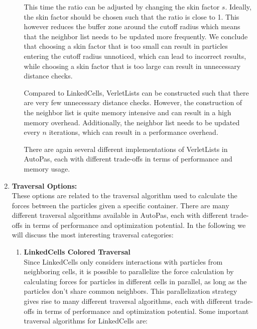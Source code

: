 \begin{enumerate}[label=\textbf{\arabic*.}]
\begin{enumerate}
                        This time the ratio can be adjusted by changing the skin factor $s$.         Ideally, the skin factor should be chosen such that the ratio is close to 1. This however reduces the buffer zone around the cutoff radius which means that the neighbor list needs to be updated more frequently. We conclude that choosing a skin factor that is too small can result in particles entering the cutoff radius unnoticed, which can lead to incorrect results, while choosing a skin factor that is too large can result in unnecessary distance checks.

                        Compared to LinkedCells, VerletLists can be constructed such that there are very few unnecessary distance checks. However, the construction of the neighbor list is quite memory intensive and can result in a high memory overhead. Additionally, the neighbor list needs to be updated every $n$ iterations, which can result in a performance overhead.

                        \textit{}

                        There are again several different implementations of VerletLists in AutoPas, each with different trade-offs in terms of performance and memory usage.

            \end{enumerate}

      \item \textbf{Traversal Options:} \\
            These options are related to the traversal algorithm used to calculate the forces between the particles given a specific container. There are many different traversal algorithms available in AutoPas, each with different trade-offs in terms of performance and optimization potential. In the following we will discuss the most interesting traversal categories:

            \begin{enumerate}

                  \item \textbf{LinkedCells Colored Traversal} \\
                        Since LinkedCells only considers interactions with particles from neighboring cells, it is possible to parallelize the force calculation by calculating forces for particles in different cells in parallel, as long as the particles don't share common neighbors. This parallelization strategy gives rise to many different traversal algorithms, each with different trade-offs in terms of performance and optimization potential. Some important traversal algorithms for LinkedCells are:


\end{enumerate}
\end{enumerate}
